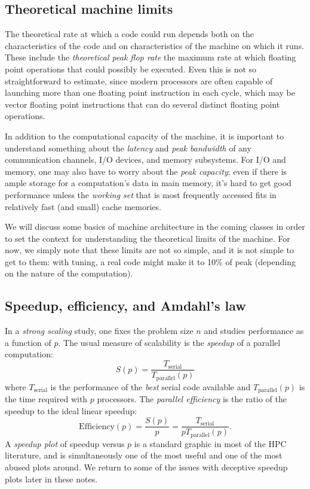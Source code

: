 \documentclass[12pt, leqno]{article} %
\begin{document}
\subsection{Theoretical machine limits}

The theoretical rate at which a code could run depends both on the
characteristics of the code and on characteristics of the machine on
which it runs. These include the \emph{theoretical peak flop rate} the
maximum rate at which floating point operations that could possibly be
executed. Even this is not so straightforward to estimate, since modern
processors are often capable of launching more than one floating point
instruction in each cycle, which may be vector floating point
instructions that can do several distinct floating point operations.

In addition to the computational capacity of the machine, it is
important to understand something about the \emph{latency} and
\emph{peak bandwidth} of any communication channels, I/O devices, and
memory subsystems. For I/O and memory, one may also have to worry about
the \emph{peak capacity}; even if there is ample storage for a
computation's data in main memory, it's hard to get good performance
unless the \emph{working set} that is most frequently accessed fits in
relatively fast (and small) cache memories.

We will discuss some basics of machine architecture in the coming
classes in order to set the context for understanding the theoretical
limits of the machine. For now, we simply note that these limits are not
so simple, and it is not simple to get to them: with tuning, a real code
might make it to 10\% of peak (depending on the nature of the
computation).

\subsection{Speedup, efficiency, and Amdahl's law}

In a \emph{strong scaling} study, one fixes the problem size $n$ and
studies performance as a function of $p$. The usual measure of
scalability is the \emph{speedup} of a parallel computation:
\[
  S(p) = \frac{T_{\mathrm{serial}}}{T_{\mathrm{parallel}}(p)}
\]
where $T_{\mathrm{serial}}$ is the performance of the \emph{best}
serial code available and $T_{\mathrm{parallel}}(p)$ is the time
required with $p$ processors. The \emph{parallel efficiency} is the
ratio of the speedup to the ideal linear speedup:
\[
  \mbox{Efficiency}(p)
    = \frac{S(p)}{p}
    = \frac{T_{\mathrm{serial}}}{p T_{\mathrm{parallel}}(p)}.
\]
A \emph{speedup plot} of speedup versus $p$ is a standard graphic in
most of the HPC literature, and is simultaneously one of the most useful
and one of the most abused plots around. We return to some of the issues
with deceptive speedup plots later in these notes.
\end{document}
